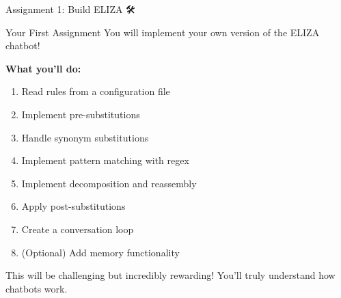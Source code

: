 \documentclass[aspectratio=169]{beamer}
\begin{document}
\begin{frame}[shrink=10]{Assignment 1: Build ELIZA 🛠️}
\small
\begin{alertblock}{Your First Assignment}
You will implement your own version of the ELIZA chatbot!
\end{alertblock}

\vspace{0.3cm}

\textbf{What you'll do:}
\begin{enumerate}\setlength{\itemsep}{0pt}
    \item Read rules from a configuration file
    \item Implement pre-substitutions
    \item Handle synonym substitutions
    \item Implement pattern matching with regex
    \item Implement decomposition and reassembly
    \item Apply post-substitutions
    \item Create a conversation loop
    \item (Optional) Add memory functionality
\end{enumerate}

\vspace{0.3cm}

\begin{thinkaboutit}
This will be challenging but incredibly rewarding! You'll truly understand how chatbots work.
\end{thinkaboutit}
\end{frame}
\end{document}
